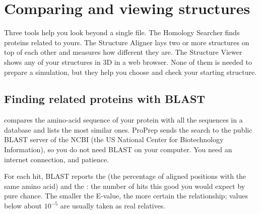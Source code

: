\chapter{Comparing and viewing structures}
\label{ch:compare}

Three tools help you look beyond a single file. The Homology Searcher finds
proteins related to yours. The Structure Aligner lays two or more structures on
top of each other and measures how different they are. The Structure Viewer
shows any of your structures in 3D in a web browser. None of them is needed to
prepare a simulation, but they help you choose and check your starting
structure.

\begin{glance}
\end{glance}

\section{Finding related proteins with BLAST}
\label{sec:compare-blast}

 compares the amino-acid sequence of your protein with all the
sequences in a database and lists the most similar ones. ProPrep sends the
search to the public BLAST server of the NCBI (the US National Center for
Biotechnology Information), so you do not need BLAST on your computer. You need
an internet connection, and patience.

For each hit, BLAST reports the  (the percentage of aligned
positions with the same amino acid) and the : the number of hits
this good you would expect by pure chance. The smaller the E-value, the more
certain the relationship; values below about $10^{-5}$ are usually taken as
real relatives.

